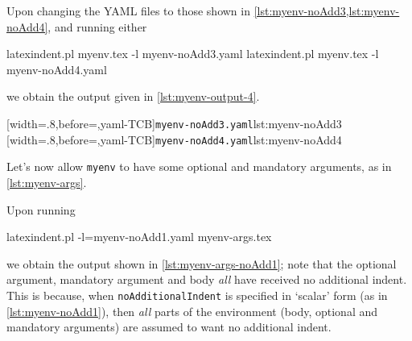  \begin{example}
 Upon changing the YAML files to those shown in \cref{lst:myenv-noAdd3,lst:myenv-noAdd4},
 and running either 

 \begin{commandshell}
latexindent.pl myenv.tex -l myenv-noAdd3.yaml  
latexindent.pl myenv.tex -l myenv-noAdd4.yaml  
\end{commandshell}

 we obtain the output given in \cref{lst:myenv-output-4}.

 \begin{cmhtcbraster}
  [width=.8\linewidth,before=\centering,yaml-TCB]{\texttt{myenv-noAdd3.yaml}}{lst:myenv-noAdd3}
  [width=.8\linewidth,before=\centering,yaml-TCB]{\texttt{myenv-noAdd4.yaml}}{lst:myenv-noAdd4}
 \end{cmhtcbraster}

 \end{example}

 \begin{example}
 Let's now allow \texttt{myenv} to have some optional and mandatory arguments, as in
 \cref{lst:myenv-args}.


 Upon running 

 \begin{commandshell}
latexindent.pl -l=myenv-noAdd1.yaml myenv-args.tex  
\end{commandshell}

 we obtain the output shown in \cref{lst:myenv-args-noAdd1}; note that the optional
 argument, mandatory argument and body \emph{all} have received no additional indent.
 This is because, when \texttt{noAdditionalIndent} is specified in `scalar' form (as in
 \cref{lst:myenv-noAdd1}), then \emph{all} parts of the environment (body, optional and
 mandatory arguments) are assumed to want no additional indent.
 \end{example}

